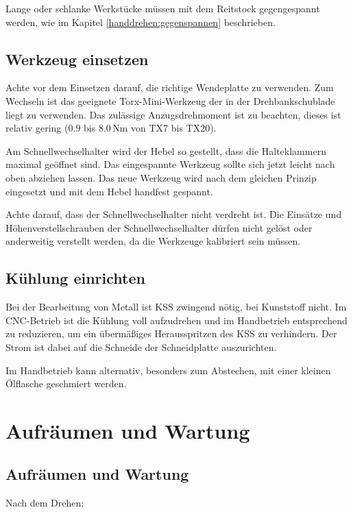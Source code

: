 \documentclass{\basedir/fablab-document}
\begin{document}
Lange oder schlanke Werkstücke müssen mit dem Reitstock gegengespannt werden,
wie im Kapitel \ref{handdrehen:gegenspannen} beschrieben.

\subsection{Werkzeug einsetzen} %
Achte vor dem Einsetzen darauf, die richtige Wendeplatte zu verwenden. Zum Wechseln ist das geeignete Torx-Mini-Werkzeug der in der Drehbankschublade liegt zu verwenden. Das zulässige Anzugsdrehmoment ist zu beachten, dieses ist relativ gering ($0.9$ bis $8.0$\,Nm von TX7 bis TX20).

Am Schnellwechselhalter wird der Hebel so gestellt, dass die Halteklammern maximal geöffnet sind.
Das eingespannte Werkzeug sollte sich jetzt leicht nach oben abziehen lassen.
Das neue Werkzeug wird nach dem gleichen Prinzip eingesetzt und mit dem Hebel handfest gespannt.

Achte darauf, dass der Schnellwechselhalter nicht verdreht ist. Die Einsätze und Höhenverstellschrauben der Schnellwechselhalter dürfen nicht gelöst oder anderweitig verstellt werden, da die Werkzeuge kalibriert sein müssen.

\subsection{Kühlung einrichten}

Bei der Bearbeitung von Metall ist KSS zwingend nötig, bei Kunststoff nicht.
Im CNC-Betrieb ist die Kühlung voll aufzudrehen und im Handbetrieb entsprechend zu reduzieren,
um ein übermäßiges Herausspritzen des KSS zu verhindern.
Der Strom ist dabei auf die Schneide der Schneidplatte auszurichten.

Im Handbetrieb kann alternativ, besonders zum Abstechen, mit einer kleinen Ölflasche geschmiert werden. 

\section{Aufräumen und Wartung}


\subsection{Aufräumen und Wartung}
Nach dem Drehen:
\end{document}
